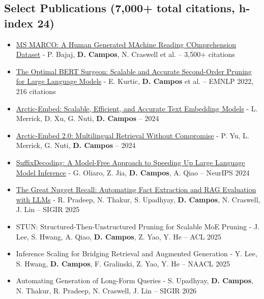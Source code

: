 \documentclass[line,margin]{res}
\begin{document}
\begin{resume}
\section{Select Publications (7,000+ total citations, h-index 24)}
\begin{itemize}
    \item \href{https://arxiv.org/abs/1611.09268}{MS MARCO: A Human Generated MAchine Reading COmprehension Dataset} - P. Bajaj, \textbf{D. Campos}, N. Craswell et al. -- 3,500+ citations
    \item \href{https://arxiv.org/abs/2203.07259}{The Optimal BERT Surgeon: Scalable and Accurate Second-Order Pruning for Large Language Models} - E. Kurtic, \textbf{D. Campos} et al. -- EMNLP 2022, 216 citations
    \item \href{https://arxiv.org/abs/2405.05374}{Arctic-Embed: Scalable, Efficient, and Accurate Text Embedding Models} - L. Merrick, D. Xu, G. Nuti, \textbf{D. Campos} -- 2024
    \item \href{https://arxiv.org/abs/2412.04506}{Arctic-Embed 2.0: Multilingual Retrieval Without Compromise} - P. Yu, L. Merrick, G. Nuti, \textbf{D. Campos} -- 2024
    \item \href{https://arxiv.org/abs/2411.04975}{SuffixDecoding: A Model-Free Approach to Speeding Up Large Language Model Inference} - G. Oliaro, Z. Jia, \textbf{D. Campos}, A. Qiao -- NeurIPS 2024
    \item \href{https://arxiv.org/abs/2504.15068}{The Great Nugget Recall: Automating Fact Extraction and RAG Evaluation with LLMs} - R. Pradeep, N. Thakur, S. Upadhyay, \textbf{D. Campos}, N. Craswell, J. Lin -- SIGIR 2025
    \item STUN: Structured-Then-Unstructured Pruning for Scalable MoE Pruning - J. Lee, S. Hwang, A. Qiao, \textbf{D. Campos}, Z. Yao, Y. He -- ACL 2025
    \item Inference Scaling for Bridging Retrieval and Augmented Generation - Y. Lee, S. Hwang, \textbf{D. Campos}, F. Gralinski, Z. Yao, Y. He -- NAACL 2025
    \item Automating Generation of Long-Form Queries - S. Upadhyay, \textbf{D. Campos}, N. Thakur, R. Pradeep, N. Craswell, J. Lin -- SIGIR 2026
\end{itemize}
\end{resume}
\end{document}
